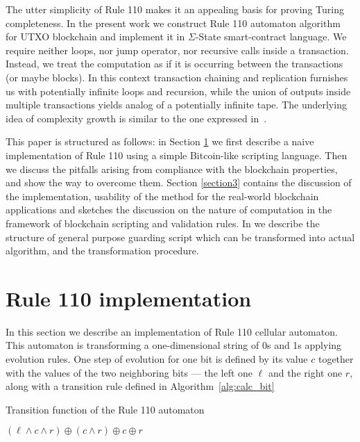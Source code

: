 \documentclass[runningheads]{llncs}
\begin{document}
    The utter simplicity of Rule 110 makes it an appealing basis for proving Turing completeness. 
    In the present work we construct Rule 110 automaton algorithm for UTXO blockchain
    and implement it in $\Sigma$-State smart-contract language\cite{chepurnoy2017sigma}.
    We require neither loops, nor jump
    operator, nor recursive calls inside a transaction. Instead, we treat the
    computation as if it is occurring between the transactions (or maybe
    blocks). In this context transaction chaining and replication furnishes us
    with potentially infinite loops and recursion, while the union of outputs
    inside multiple transactions yields analog of a potentially infinite tape.
    The underlying idea of complexity growth is similar to the one expressed
    in~\cite{von1951general,von1966theory}.

    This paper is structured as follows: in Section \ref{section2} we first
    describe a naive implementation of Rule 110 using a simple Bitcoin-like
    scripting language.  Then we discuss the pitfalls arising from compliance
    with the blockchain properties, and show the way to overcome them.  Section
    \ref{section3} contains the discussion of the implementation, usability of
    the method for the real-world blockchain applications and sketches the
    discussion on the nature of computation in the framework of blockchain
    scripting and validation rules.
    In  we describe the structure of general purpose guarding script
    which can be transformed into actual algorithm, and the transformation procedure.
    
    \section{Rule 110 implementation}
    \label{section2}

    In this section we describe an implementation of Rule 110 cellular automaton. This automaton
    is transforming a one-dimensional string of 0s and 1s applying evolution rules. One
    step of evolution for one bit is defined by its value $c$ together with the
    values of the two neighboring bits --- the left one $\ell$ and the right one $r$, along with a 
    transition rule defined in Algorithm~\ref{alg:calc_bit}

    \begin{algorithm}[H]
        \caption{Transition function of the Rule 110 automaton}
        \label{alg:calc_bit}
        \begin{algorithmic}[1]
            \State
            \Return $(\ell\wedge c\wedge r) \oplus (c\wedge r) \oplus c \oplus r$
            \EndFunction
        \end{algorithmic}
    \end{algorithm}
\end{document}
